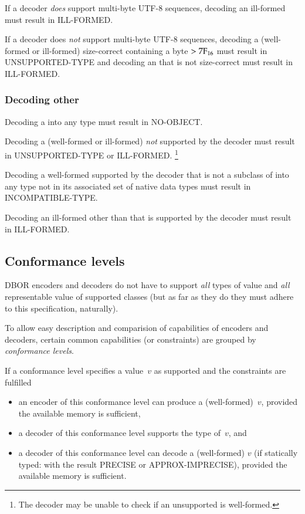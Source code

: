 \medskip
If a decoder \emph{does} support multi-byte UTF-8 sequences,
decoding an ill-formed \DborUtfEightStringValue{} must result in ILL-FORMED.

\medskip
If a decoder does \emph{not} support multi-byte UTF-8 sequences,
decoding a (well-formed or ill-formed) size-correct \DborUtfEightStringValue{} containing a byte $> \mathrm{7F}_{16}$
must result in UNSUPPORTED-TYPE and
decoding an \DborUtfEightStringValue{} that is not size-correct must result in ILL-FORMED.


\subsubsection{Decoding other \DborValue}

Decoding a \DborNoneValue{} into any type must result in NO-OBJECT.

\medskip
Decoding a (well-formed or ill-formed) \DborValue{} \emph{not} supported by the decoder
must result in UNSUPPORTED-TYPE or ILL-FORMED.%
\footnote{%
    The decoder may be unable to check if an unsupported \DborValue{} is well-formed.
}

\medskip
Decoding a well-formed \DborValue{} supported by the decoder that is not a subclass of \DborNumberValue{}
into any type not in its associated set of native data types must result in INCOMPATIBLE-TYPE.

\medskip
Decoding an ill-formed \DborValue{} other than \DborUtfEightStringValue{}
that is supported by the decoder must result in ILL-FORMED.


\subsection{Conformance levels}
\label{sec:conformancelevels}

DBOR encoders and decoders do not have to support \emph{all} types of value and \emph{all} representable value
of supported classes (but as far as they do they must adhere to this specification, naturally).

To allow easy description and comparision of capabilities of encoders and decoders,
certain common capabilities (or constraints) are grouped by \emph{conformance levels}.

\medskip
If a conformance level specifies a value~$v$ as supported and the constraints are fulfilled
\begin{itemize}
    \item
    an encoder of this conformance level can produce a (well-formed)~$v$,
    provided the available memory is sufficient,

    \item
    a decoder of this conformance level supports the type of~$v$, and

    \item
    a decoder of this conformance level can decode a (well-formed) $v$
    (if statically typed: with the result PRECISE or APPROX-IMPRECISE),
    provided the available memory is sufficient.
\end{itemize}

